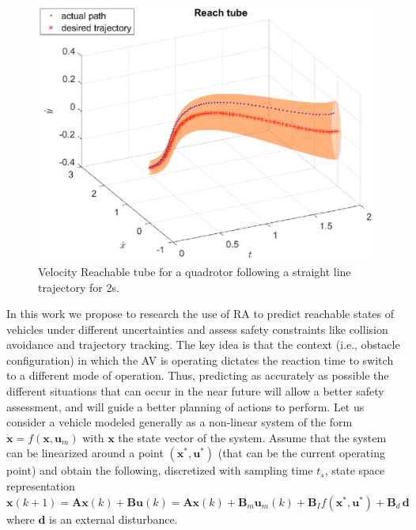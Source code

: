 \begin{figure}
\vspace{-5pt}
\centering
\includegraphics[width = \linewidth ]{fig/reach_set_vel.eps} 
\caption{Velocity Reachable tube for a quadrotor following a straight line trajectory for 2s.}
\vspace{-5pt}
\label{fig:reach_set}\end{figure}
In this work we propose to research the use of RA to predict reachable states of vehicles under different uncertainties and assess safety constraints like collision avoidance and trajectory tracking. The key idea is that the context (i.e., obstacle configuration) in which the AV is operating dictates the reaction time to switch to a different mode of operation. Thus, predicting as accurately as possible the different situations that can occur in the near future will allow a better safety assessment,  and will guide a better planning of actions to perform.
 Let us consider a vehicle modeled generally as a non-linear system of the form $\dot{\bm{x}} = f(\bm{x}, \bm{u}_m)$ with $\bm{x}$ the state vector of the system.
Assume that the system can be linearized around a point $\left(\bm{x}^{*}, \bm{u}^{*}\right)$ (that can be the current operating point) and obtain the following, discretized with sampling time $t_s$, state space representation $\bm{x}(k+1) =  \bm{A} \bm{x}(k) + \bm{B} \bm{u}(k) =  \bm{A} \bm{x}(k) + \bm{B}_m \bm{u}_m(k) + \bm{B}_I f\left(\bm{x}^{*}, \bm{u}^{*}\right) + \bm{B}_d \, \bm{d}$
where $\bm{d}$ is an external disturbance.  %



